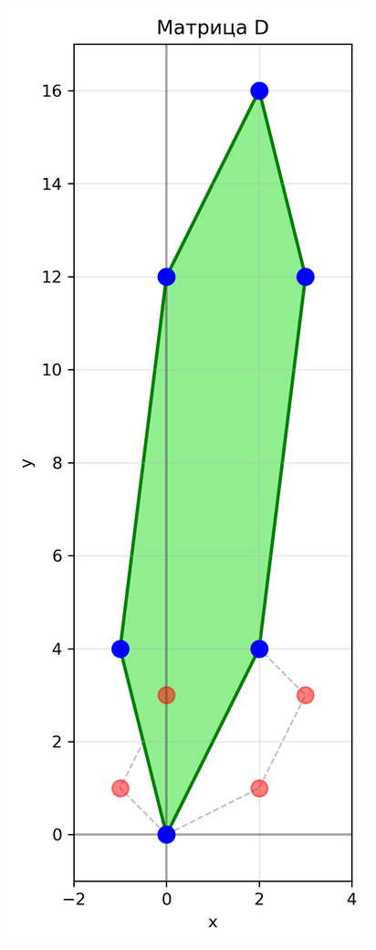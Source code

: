 \begin{figure}[h]
\begin{minipage}{0.23\textwidth}
\includegraphics[width=\textwidth]{images/task1/matrix_D.png}

\end{minipage}
\end{figure}
